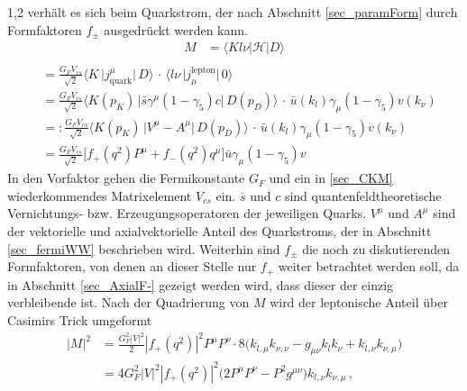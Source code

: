 \documentclass[11pt,a4paper,twoside]{report}
\begin{document}
\begin{spacing}{1,2}
verhält es sich beim Quarkstrom, der nach Abschnitt \ref{sec_paramForm} durch Formfaktoren $f_\pm$ ausgedrückt werden kann.
\begin{align*}
 M &= \big\langle Kl\nu|\mathcal{H}|D\big\rangle\nonumber\\
 \end{align*}
 \begin{align}
 &= \frac{G_F V_{cs}}{\sqrt{2}}\big\langle K\, \big|j_\text{quark}^\mu\big|\,D \big\rangle \,\cdot\,\big\langle l\nu\,\big|j_\mu^\text{lepton}\big|\,0\big\rangle\nonumber\\
 &= \frac{G_F V_{cs}}{\sqrt{2}}\big\langle K(p_K)\, \big|\bar s \gamma^\mu(1-\gamma_5) c \big|\,D(p_D) \big\rangle \, \cdot \,\bar u(k_l) \gamma_\mu(1-\gamma_5)v(k_\nu)\nonumber\\
 &=: \frac{G_F V_{cs}}{\sqrt{2}}\big\langle K(p_K)\, \big|V^\mu - A^\mu\big|\,D(p_D) \big\rangle \, \cdot \,\bar u(k_l) \gamma_\mu(1-\gamma_5)v(k_\nu)\nonumber\\
 &=\frac{G_F V_{cs}}{\sqrt{2}} \big[f_+(q^2) P^\mu  + f_-(q^2) q^\mu\big] \bar u \gamma_\mu(1-\gamma_5)v
 \label{eq_fermiMG_F}
 \end{align}
In den Vorfaktor gehen die Fermikonstante $G_F$ und ein in \ref{sec_CKM} wiederkommendes Matrixelement $V_{cs}$ ein. $\bar s$ und $c$ sind quantenfeldtheoretische 
Vernichtungs- bzw. Erzeugungsoperatoren der jeweiligen Quarks. $V^\mu$ und $A^\mu$ sind der vektorielle und axialvektorielle Anteil des Quarkstroms, der 
in Abschnitt \ref{sec_fermiWW} beschrieben wird. Weiterhin sind $f_\pm$ die noch zu
diskutierenden Formfaktoren, von denen an dieser Stelle nur $f_+$ weiter betrachtet werden soll, da in Abschnitt \ref{sec_AxialF-} gezeigt werden wird, 
dass dieser der einzig verbleibende ist. Nach der Quadrierung von $M$ wird der leptonische Anteil über 
Casimirs Trick \cite{Griffiths} umgeformt
\begin{align}
 \big|M\big|^2 &= \frac{G_F^2|V|^2}{2}|f_+(q^2)|^2 P^\mu P^\nu \cdot 8\big(k_{l,\mu} k_{\nu,\nu} - g_{\mu\nu}k_lk_\nu + k_{l,\nu}k_{\nu,\mu}\big)\nonumber\\
 &=4G_F^2|V|^2 |f_+(q^2)|^2 \big(2P^\mu P^\nu - P^2 g^{\mu\nu}\big) k_{l,\nu}k_{\nu,\mu}\,,
 \label{eq_fermiMelement}
\end{align}

\end{spacing}
\end{document}
